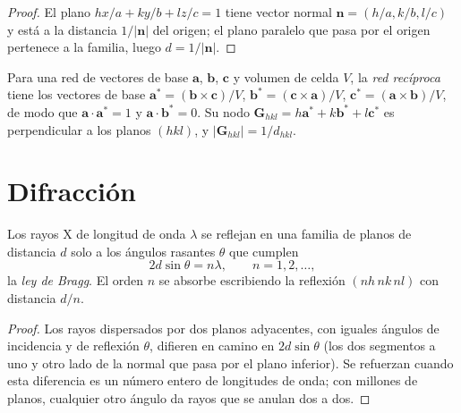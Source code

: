 \begin{proof}
El plano $hx/a + ky/b + lz/c = 1$ tiene vector normal $\mathbf n = (h/a, k/b, l/c)$
y está a la distancia $1/|\mathbf n|$ del origen; el plano paralelo que pasa por
el origen pertenece a la familia, luego $d = 1/|\mathbf n|$.
\end{proof}

\begin{definition}\label{def:b3:x-ray-diffraction:reciprocal}
Para una red de vectores de base $\mathbf a$, $\mathbf b$, $\mathbf c$ y volumen de celda $V$,
la \emph{red recíproca} tiene los vectores de base
$\mathbf a^* = (\mathbf b\times\mathbf c)/V$, $\mathbf b^* = (\mathbf c\times\mathbf a)/V$,
$\mathbf c^* = (\mathbf a\times\mathbf b)/V$, de modo que $\mathbf a\cdot\mathbf a^* = 1$ y
$\mathbf a\cdot\mathbf b^* = 0$. Su nodo $\mathbf G_{hkl} = h\mathbf a^* + k\mathbf b^* + l\mathbf c^*$ es
perpendicular a los planos $(hkl)$, y $|\mathbf G_{hkl}| = 1/d_{hkl}$.
\end{definition}

\section{Difracción}

\begin{theorem}\label{thm:b3:x-ray-diffraction:bragg}
Los rayos X de longitud de onda $\lambda$ se reflejan en una familia de planos de distancia $d$
solo a los ángulos rasantes $\theta$ que cumplen
\[
2d\sin\theta = n\lambda, \qquad n = 1, 2, \dots,
\]
la \emph{ley de Bragg}. El orden $n$ se absorbe escribiendo la
reflexión $(nh\,nk\,nl)$ con distancia $d/n$.
\end{theorem}

\begin{proof}
Los rayos dispersados por dos planos adyacentes, con iguales ángulos de incidencia y de
reflexión $\theta$, difieren en camino en $2d\sin\theta$ (los dos segmentos a uno y otro lado
de la normal que pasa por el plano inferior). Se refuerzan cuando esta diferencia es
un número entero de longitudes de onda; con millones de planos, cualquier otro ángulo da
rayos que se anulan dos a dos.
\end{proof}

